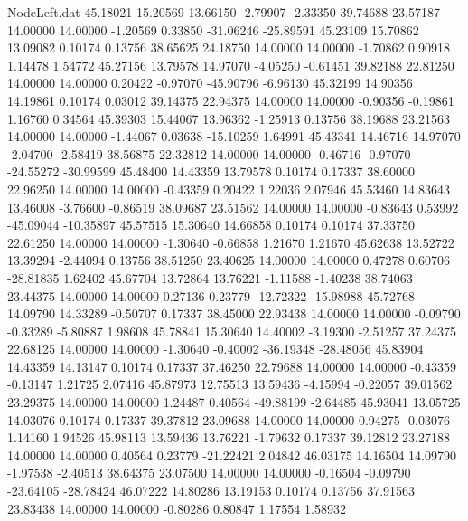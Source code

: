 \begin{filecontents}{NodeLeft.dat}
  45.18021   15.20569   13.66150    -2.79907   -2.33350   39.74688   23.57187   14.00000   14.00000   -1.20569    0.33850  -31.06246  -25.89591
  45.23109   15.70862   13.09082     0.10174    0.13756   38.65625   24.18750   14.00000   14.00000   -1.70862    0.90918    1.14478    1.54772
  45.27156   13.79578   14.97070    -4.05250   -0.61451   39.82188   22.81250   14.00000   14.00000    0.20422   -0.97070  -45.90796   -6.96130
  45.32199   14.90356   14.19861     0.10174    0.03012   39.14375   22.94375   14.00000   14.00000   -0.90356   -0.19861    1.16760    0.34564
  45.39303   15.44067   13.96362    -1.25913    0.13756   38.19688   23.21563   14.00000   14.00000   -1.44067    0.03638  -15.10259    1.64991
  45.43341   14.46716   14.97070    -2.04700   -2.58419   38.56875   22.32812   14.00000   14.00000   -0.46716   -0.97070  -24.55272  -30.99599
  45.48400   14.43359   13.79578     0.10174    0.17337   38.60000   22.96250   14.00000   14.00000   -0.43359    0.20422    1.22036    2.07946
  45.53460   14.83643   13.46008    -3.76600   -0.86519   38.09687   23.51562   14.00000   14.00000   -0.83643    0.53992  -45.09044  -10.35897
  45.57515   15.30640   14.66858     0.10174    0.10174   37.33750   22.61250   14.00000   14.00000   -1.30640   -0.66858    1.21670    1.21670
  45.62638   13.52722   13.39294    -2.44094    0.13756   38.51250   23.40625   14.00000   14.00000    0.47278    0.60706  -28.81835    1.62402
  45.67704   13.72864   13.76221    -1.11588   -1.40238   38.74063   23.44375   14.00000   14.00000    0.27136    0.23779  -12.72322  -15.98988
  45.72768   14.09790   14.33289    -0.50707    0.17337   38.45000   22.93438   14.00000   14.00000   -0.09790   -0.33289   -5.80887    1.98608
  45.78841   15.30640   14.40002    -3.19300   -2.51257   37.24375   22.68125   14.00000   14.00000   -1.30640   -0.40002  -36.19348  -28.48056
  45.83904   14.43359   14.13147     0.10174    0.17337   37.46250   22.79688   14.00000   14.00000   -0.43359   -0.13147    1.21725    2.07416
  45.87973   12.75513   13.59436    -4.15994   -0.22057   39.01562   23.29375   14.00000   14.00000    1.24487    0.40564  -49.88199   -2.64485
  45.93041   13.05725   14.03076     0.10174    0.17337   39.37812   23.09688   14.00000   14.00000    0.94275   -0.03076    1.14160    1.94526
  45.98113   13.59436   13.76221    -1.79632    0.17337   39.12812   23.27188   14.00000   14.00000    0.40564    0.23779  -21.22421    2.04842
  46.03175   14.16504   14.09790    -1.97538   -2.40513   38.64375   23.07500   14.00000   14.00000   -0.16504   -0.09790  -23.64105  -28.78424
  46.07222   14.80286   13.19153     0.10174    0.13756   37.91563   23.83438   14.00000   14.00000   -0.80286    0.80847    1.17554    1.58932

\end{filecontents}

